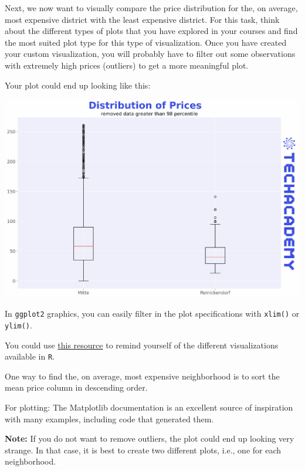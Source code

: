 \documentclass[
  11pt,
]{article}
\newenvironment{tips}[1]
  {
  \begin{itemize}
  \footnotesize
  \renewcommand{\labelitemi}{
    \raisebox{-.7\height}[0pt][0pt]{
      {\setkeys{Gin}{width=3em,keepaspectratio}
        \texttt{[image: images/\#1.png]}}
    }
  }
  \setlength{\fboxsep}{1em}
  \begin{rbox}
  \item
  }
  {
  \end{rbox}
  \end{itemize}
  }
\newenvironment{tipsp}[1]
  {
  \begin{itemize}
  \footnotesize
  \renewcommand{\labelitemi}{
    \raisebox{-.7\height}[0pt][0pt]{
      {\setkeys{Gin}{width=3em,keepaspectratio}
        \texttt{[image: images/\#1.png]}}
    }
  }
  \setlength{\fboxsep}{1em}
  \begin{pbox}
  \item
  }
  {
  \end{pbox}
  \end{itemize}
  }
\begin{document}
Next, we now want to visually compare the price distribution for the, on average, most expensive district with the least expensive district.
For this task, think about the different types of plots that you have explored in your courses and find the most suited plot type for this type of visualization.
Once you have created your custom visualization, you will probably have to filter out some observations with extremely high prices (outliers) to get a more meaningful plot.

Your plot could end up looking like this:

\begin{center}\includegraphics[width=1\linewidth]{plot/01_python/box_plots} \end{center}

\begin{tips}r
In \texttt{ggplot2} graphics, you can easily filter in the plot specifications with \texttt{xlim()} or \texttt{ylim()}.

You could use \href{https://www.r-graph-gallery.com}{this resource} to remind yourself of the different visualizations available in \texttt{R}.

\end{tips}

\begin{tipsp}p
One way to find the, on average, most expensive neighborhood is to sort the mean price column in descending order.

For plotting: The Matplotlib documentation is an excellent source of inspiration with many examples, including code that generated them.

\textbf{Note:} If you do not want to remove outliers, the plot could end up looking very strange.
In that case, it is best to create two different plots, i.e., one for each neighborhood.

\end{tipsp}
\end{document}
